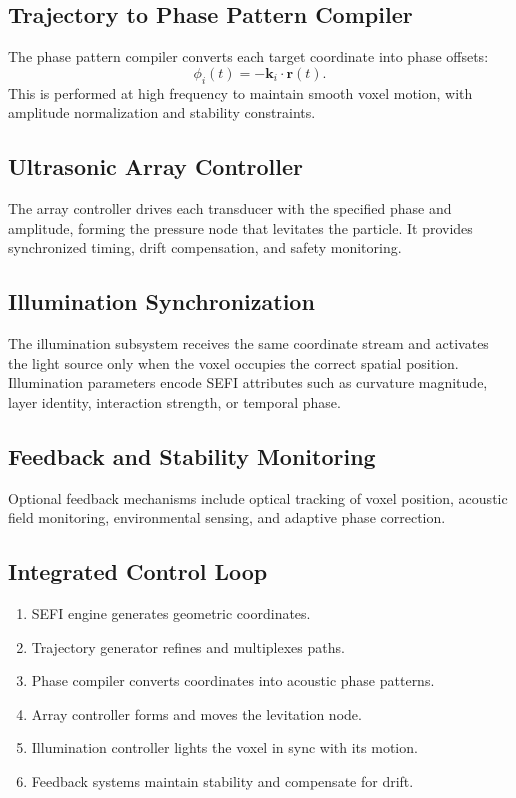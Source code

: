 \documentclass[10pt,twocolumn]{article}
\begin{document}
\subsection{Trajectory to Phase Pattern Compiler}
The phase pattern compiler converts each target coordinate into phase offsets:
\begin{equation}
\phi_{i}(t) = -\mathbf{k}_{i} \cdot \mathbf{r}(t).
\end{equation}
This is performed at high frequency to maintain smooth voxel motion, with amplitude normalization and stability constraints.

\subsection{Ultrasonic Array Controller}
The array controller drives each transducer with the specified phase and amplitude, forming the pressure node that levitates the particle. It provides synchronized timing, drift compensation, and safety monitoring.

\subsection{Illumination Synchronization}
The illumination subsystem receives the same coordinate stream and activates the light source only when the voxel occupies the correct spatial position. Illumination parameters encode SEFI attributes such as curvature magnitude, layer identity, interaction strength, or temporal phase.

\subsection{Feedback and Stability Monitoring}
Optional feedback mechanisms include optical tracking of voxel position, acoustic field monitoring, environmental sensing, and adaptive phase correction.

\subsection{Integrated Control Loop}
\begin{enumerate}
    \item SEFI engine generates geometric coordinates.
    \item Trajectory generator refines and multiplexes paths.
    \item Phase compiler converts coordinates into acoustic phase patterns.
    \item Array controller forms and moves the levitation node.
    \item Illumination controller lights the voxel in sync with its motion.
    \item Feedback systems maintain stability and compensate for drift.
\end{enumerate}
\end{document}
